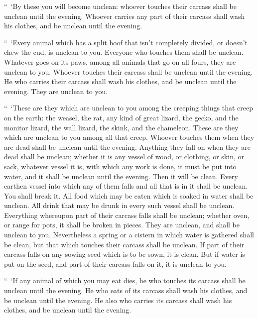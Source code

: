 {\par }{\PP {}“ ‘By these you will become unclean: whoever touches their carcass shall be unclean until the evening.
Whoever carries any part of their carcass shall wash his clothes, and be unclean until the evening.
\par }{\PP {}“ ‘Every animal which has a split hoof that isn’t completely divided, or doesn’t chew the cud, is unclean to you. Everyone who touches them shall be unclean.
Whatever goes on its paws, among all animals that go on all fours, they are unclean to you. Whoever touches their carcass shall be unclean until the evening.
He who carries their carcass shall wash his clothes, and be unclean until the evening. They are unclean to you.
\par }{\PP {}“ ‘These are they which are unclean to you among the creeping things that creep on the earth: the weasel, the rat, any kind of great lizard,
the gecko, and the monitor lizard, the wall lizard, the skink, and the chameleon.
These are they which are unclean to you among all that creep. Whoever touches them when they are dead shall be unclean until the evening.
Anything they fall on when they are dead shall be unclean; whether it is any vessel of wood, or clothing, or skin, or sack, whatever vessel it is, with which any work is done, it must be put into water, and it shall be unclean until the evening. Then it will be clean.
Every earthen vessel into which any of them falls and all that is in it shall be unclean. You shall break it.
All food which may be eaten which is soaked in water shall be unclean. All drink that may be drunk in every such vessel shall be unclean.
Everything whereupon part of their carcass falls shall be unclean; whether oven, or range for pots, it shall be broken in pieces. They are unclean, and shall be unclean to you.
Nevertheless a spring or a cistern in which water is gathered shall be clean, but that which touches their carcass shall be unclean.
If part of their carcass falls on any sowing seed which is to be sown, it is clean.
But if water is put on the seed, and part of their carcass falls on it, it is unclean to you.
\par }{\PP {}“ ‘If any animal of which you may eat dies, he who touches its carcass shall be unclean until the evening.
He who eats of its carcass shall wash his clothes, and be unclean until the evening. He also who carries its carcass shall wash his clothes, and be unclean until the evening.
}

